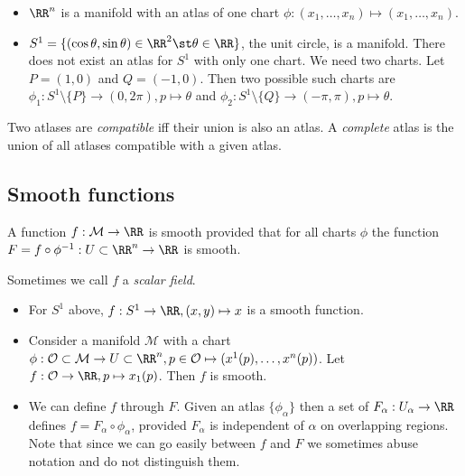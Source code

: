 \documentclass{jknotes}
\begin{document}
\begin{eg}
    \begin{itemize}
        \item \(\RR^n\) is a manifold with an atlas of one chart \(\phi:(x_1,\dots,x_n)\mapsto(x_1,\dots,x_n)\).
        \item \(S^1 = \{(\cos\theta,\sin\theta)\in\RR^2 \st \theta \in \RR\}\), the unit circle, is a manifold. There does not exist an atlas for \(S^1\) with only one chart. We need two charts. Let \(P=(1,0)\) and \(Q=(-1,0)\). Then two possible such charts are \(\phi_1:S^1\setminus\{P\}\to(0,2\pi),p \mapsto \theta\) and \(\phi_2:S^1\setminus\{Q\}\to(-\pi,\pi),p\mapsto \theta\).
    \end{itemize}
\end{eg}

\begin{defn}
    Two atlases are \emph{compatible} iff their union is also an atlas. A \emph{complete} atlas is the union of all atlases compatible with a given atlas.
\end{defn}

\subsection{Smooth functions}
\begin{defn}
    A function \(f:\mathcal{M}\to\RR\) is smooth provided that for all charts \(\phi\) the function \(F=f\circ\phi^{-1}:U\subset\RR^n\to\RR\) is smooth.
\end{defn}
Sometimes we call \(f\) a \emph{scalar field}.
\begin{eg}
    \begin{itemize}
        \item For \(S^1\) above, \(f:S^1\to\RR,(x,y)\mapsto x\) is a smooth function.
        \item Consider a manifold \(\mathcal{M}\) with a chart \(\phi:\mathcal{O}\subset\mathcal{M}\to U\subset\RR^n, p\in\mathcal{O}\mapsto (x^1(p),\dots,x^n(p))\). Let \(f:\mathcal{O}\to\RR,p\mapsto x_1(p)\). Then \(f\) is smooth.
        \item We can define \(f\) through \(F\). Given an atlas \(\{\phi_\alpha\}\) then a set of \(F_\alpha:U_\alpha \to \RR\) defines \(f = F_\alpha\circ\phi_\alpha\), provided \(F_\alpha\) is independent of \(\alpha\) on overlapping regions. Note that since we can go easily between \(f\) and \(F\) we sometimes abuse notation and do not distinguish them.
    \end{itemize}
\end{eg}
\end{document}

